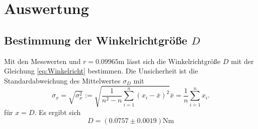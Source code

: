 \section{Auswertung} %
\label{sec:swrtng}


\subsection{Bestimmung der Winkelrichtgröße $D$}

\noindent Mit den Messwerten und $r=0.09965\si{\meter}$ lässt sich die Winkelrichtgröße $D$ mit der Gleichung \eqref{eq:Winkelricht} bestimmen. Die Unsicherheit ist die Standardabweichung des Mittelwertes $\sigma_D$ mit
\begin{subequations}
	\begin{equation}
		\sigma_x = \sqrt{\sigma_x^2} := \sqrt{\frac{1}{n^2-n} \sum_{i=1}^n{(x_i-\bar{x})^2}}
	\end{equation}
	\begin{equation}
		\bar{x} = \frac{1}{n} \sum_{i=1}^n{x_i}.
	\end{equation}
\end{subequations}
für $x=D$.
Es ergibt sich 
\begin{equation}
	\label{wert:Winkelricht}
	D=(0.0757\pm0.0019)\si{\newton\meter}
\end{equation}

